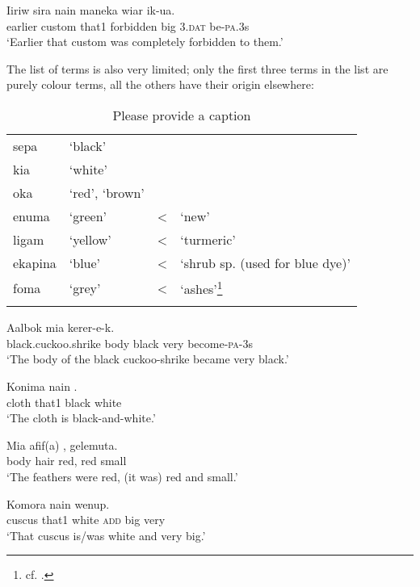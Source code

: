 \ea%
\label{ex:3:x1759}
\gll Iiriw sira nain  maneka wiar ik-ua. \\
earlier custom that1 forbidden big 3.\textsc{dat} be-\textsc{pa}.3s\\
\glt`Earlier that custom was completely forbidden to them.'
\z

The list of  terms is also very limited; only the first three terms in the list are purely colour terms, all the others have their origin elsewhere:

\begin{table}
\caption{Please provide a caption}
\label{} 
\begin{tabular}{llcl}
\mytoprule
sepa &`black'&&\\
kia &`white'&&\\
oka &`red', `brown'&&\\
enuma &`green' &{\textless} &`new'\\
ligam &`yellow' &{\textless} &`turmeric'\\
ekapina &`blue' &{\textless} &`shrub sp. (used for blue dye)'\\
foma &`grey' &{\textless} &`ashes'\footnote{cf. \cite[4]{BerlinEtAl1969}.}\\
\mybottomrule
\end{tabular}

\end{table}

\ea%
\label{ex:3:x1753}
\gll Aalbok mia    kerer-e-k. \\
black.cuckoo.shrike body black very become-\textsc{pa}-3s\\
\glt`The body of the black cuckoo-shrike became very black.'
\z

\ea%
\label{ex:3:x109}
\gll Konima nain  . \\
cloth that1 black white\\
\glt`The cloth is black-and-white.'
\z

\ea%
\label{ex:3:x1754}
\gll Mia afif(a) ,  gelemuta. \\
body hair red, red small\\
\glt`The feathers were red, (it was) red and small.'
\z

\ea%
\label{ex:3:x1755}
\gll Komora nain    wenup. \\
cuscus that1 white \textsc{add} big very\\
\glt`That cuscus is/was white and very big.'
\z

